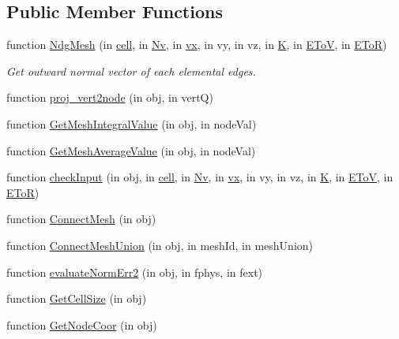 \subsection*{Public Member Functions}
\begin{DoxyCompactItemize}
\item 
function \hyperlink{class_ndg_mesh_ac730358d067c783a40bbb96b61d3d18e}{Ndg\+Mesh} (in \hyperlink{class_ndg_mesh_a6f128cd638adcec9a184937ad483232a}{cell}, in \hyperlink{class_ndg_mesh_a1d100eb162c56c890e007b8d2ff267a3}{Nv}, in \hyperlink{class_ndg_mesh_a2b7b3abe64802afdb217cce9a2cb3f04}{vx}, in vy, in vz, in \hyperlink{class_ndg_mesh_a81fc6a6affd3609e69eb1b8fc72b7f2f}{K}, in \hyperlink{class_ndg_mesh_a3ab88286c8e628f39ad7654d8e43fd96}{E\+ToV}, in \hyperlink{class_ndg_mesh_a58a82bb05a658319454739725b098e2a}{E\+ToR})
\begin{DoxyCompactList}\small\item\em Get outward normal vector of each elemental edges. \end{DoxyCompactList}\item 
function \hyperlink{class_ndg_mesh_ac4551670625ec38d0e26bbc8bb40db57}{proj\+\_\+vert2node} (in obj, in vertQ)
\item 
function \hyperlink{class_ndg_mesh_ab31cae50703f6ce7c8ba61ade1351e17}{Get\+Mesh\+Integral\+Value} (in obj, in node\+Val)
\item 
function \hyperlink{class_ndg_mesh_ade6319003ec672520dcaf0a810871603}{Get\+Mesh\+Average\+Value} (in obj, in node\+Val)
\item 
function \hyperlink{class_ndg_mesh_a7a717d5e01e59defee0c2cf6f2782e24}{check\+Input} (in obj, in \hyperlink{class_ndg_mesh_a6f128cd638adcec9a184937ad483232a}{cell}, in \hyperlink{class_ndg_mesh_a1d100eb162c56c890e007b8d2ff267a3}{Nv}, in \hyperlink{class_ndg_mesh_a2b7b3abe64802afdb217cce9a2cb3f04}{vx}, in vy, in vz, in \hyperlink{class_ndg_mesh_a81fc6a6affd3609e69eb1b8fc72b7f2f}{K}, in \hyperlink{class_ndg_mesh_a3ab88286c8e628f39ad7654d8e43fd96}{E\+ToV}, in \hyperlink{class_ndg_mesh_a58a82bb05a658319454739725b098e2a}{E\+ToR})
\item 
function \hyperlink{class_ndg_mesh_aca29f00b36467877cc91e40c9115d382}{Connect\+Mesh} (in obj)
\item 
function \hyperlink{class_ndg_mesh_ac6aa491a31562afeb8f773dd39c7d211}{Connect\+Mesh\+Union} (in obj, in mesh\+Id, in mesh\+Union)
\item 
function \hyperlink{class_ndg_mesh_a3ea6c4e607a79b0a57588efb85b13123}{evaluate\+Norm\+Err2} (in obj, in fphys, in fext)
\item 
function \hyperlink{class_ndg_mesh_abe70614e9ead0f552dc0b394da5204d2}{Get\+Cell\+Size} (in obj)
\item 
function \hyperlink{class_ndg_mesh_abbe1bf39da982f5badf5728324b5df0c}{Get\+Node\+Coor} (in obj)
\end{DoxyCompactItemize}
